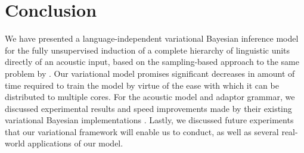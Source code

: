 \documentclass[12pt,letterpaper]{article}
\begin{document}
\section{Conclusion} 
We have presented a language-independent variational Bayesian inference model for the fully unsupervised induction of a complete hierarchy of linguistic units directly of an acoustic input, based on the sampling-based approach to the same problem by \citet{lee:2015}. Our variational model promises significant decreases in amount of time required to train the model by virtue of the ease with which it can be distributed to multiple cores. For the acoustic model and adaptor grammar, we discussed experimental results and speed improvements made by their existing variational Bayesian implementations \citep{ondel:2016, cohen:2010, zhai:2014}. Lastly, we discussed future experiments that our variational framework will enable us to conduct, as well as several real-world applications of our model. 


\appendix



\newpage 



\end{document}
